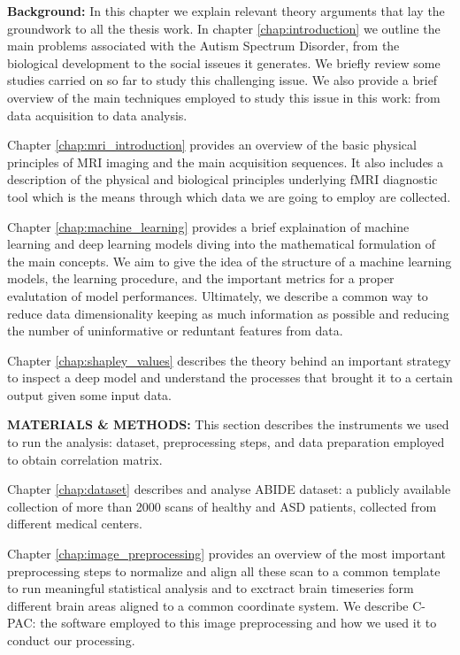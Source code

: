\documentclass[11pt]{report}
\begin{document}
\textbf{Background:} In this chapter we explain relevant theory arguments that lay the groundwork to all the thesis work.
In chapter \ref{chap:introduction} we outline the main problems associated with the Autism Spectrum Disorder, from the biological development to the social isseues it generates. We briefly review some studies carried on so far to study this challenging issue. We also provide a brief overview of the main techniques employed to study this issue in this work: from data acquisition to data analysis.

Chapter \ref{chap:mri_introduction} provides an overview of the basic physical principles of MRI imaging and the main acquisition sequences. It also includes a description of the physical and biological principles underlying fMRI diagnostic tool which is the means through which data we are going to employ are collected.

Chapter \ref{chap:machine_learning} provides a brief explaination of machine learning and deep learning models diving into the mathematical formulation of the main concepts. We aim to give the idea of the structure of a machine learning models, the learning procedure, and the important metrics for a proper evalutation of model performances.
Ultimately, we describe a common way to reduce data dimensionality keeping as much information as possible and reducing the number of uninformative or reduntant features from data.

Chapter \ref{chap:shapley_values} describes the theory behind an important strategy to inspect a deep model  and understand the processes that brought it to a certain output given some input data.

\textbf{MATERIALS \& METHODS:} This section describes the instruments we used to run the analysis: dataset, preprocessing steps, and data preparation employed to obtain correlation matrix.

Chapter \ref{chap:dataset} describes and analyse ABIDE dataset: a publicly available collection of more than 2000 scans of healthy and ASD patients, collected from different medical centers.

Chapter \ref{chap:image_preprocessing} provides an overview of the most important preprocessing steps to normalize and align all these scan to a common template to run meaningful statistical analysis and to exctract brain timeseries form different brain areas aligned to a common coordinate system. We describe C-PAC: the software employed to this image preprocessing and how we used it to conduct our processing.
\end{document}
